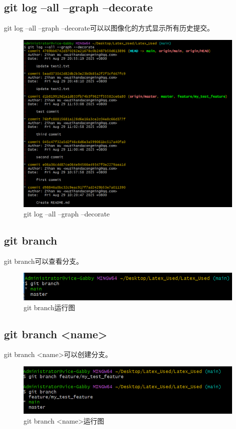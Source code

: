 \documentclass{article}
\begin{document}
\subsection{git log --all --graph --decorate}
git log --all --graph --decorate可以以图像化的方式显示所有历史提交。
\begin{figure}[H]
    \centering
    \includegraphics[width=1\linewidth]{git_log_decorate.png}
    \caption{git log --all --graph --decorate}
    \label{fig:log1}
\end{figure}

\subsection{git branch}
git branch可以查看分支。
\begin{figure}[H]
    \centering
    \includegraphics[width=1\linewidth]{git_branch.png}
    \caption{git branch运行图}
    \label{fig:branch}
\end{figure}

\subsection{git branch <name>}
git branch <name>可以创建分支。
\begin{figure}[H]
    \centering
    \includegraphics[width=1\linewidth]{git_branch_name.png}
    \caption{git branch <name>运行图}
    \label{fig:branch1}
\end{figure}
\end{document}
